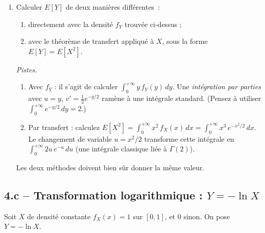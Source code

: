 \begin{enumerate}
  \item Calculer $E[Y]$ de deux manières différentes~:
  \begin{enumerate}
    \item directement avec la densité $f_Y$ trouvée ci-dessus ;
    \item avec le théorème de transfert appliqué à $X$,
  sous la forme $E[Y]=E[X^2]$.
  \end{enumerate}
  \begin{solution}
    \textit{Pistes.}
    \begin{enumerate}
    \item Avec $f_Y$ : il s'agit de calculer
    $\int_0^{+\infty}y\,f_Y(y)\,dy$. Une \emph{intégration par
    parties} avec $u=y$, $v'=\tfrac{1}{2}e^{-y/2}$ ramène à une
    intégrale standard. (Pensez à utiliser
    $\int_0^{+\infty}e^{-y/2}\,dy=2$.)
    \item Par transfert : calculez $E[X^2]=\int_0^{+\infty}x^2\,f_X(x)\,dx
    =\int_0^{+\infty}x^3\,e^{-x^2/2}\,dx$. Le changement de variable
    $u=x^2/2$ transforme cette intégrale en
    $\int_0^{+\infty}2u\,e^{-u}\,du$ (une intégrale classique liée
    à $\Gamma(2)$).
    \end{enumerate}
    Les deux méthodes doivent bien sûr donner la même valeur.
  \end{solution}
\end{enumerate}

\subsection*{4.c -- Transformation logarithmique : $Y=-\ln X$}

Soit $X$ de densité constante $f_X(x)=1$ sur $[0,1]$, et $0$ sinon.
On pose $Y=-\ln X$.

